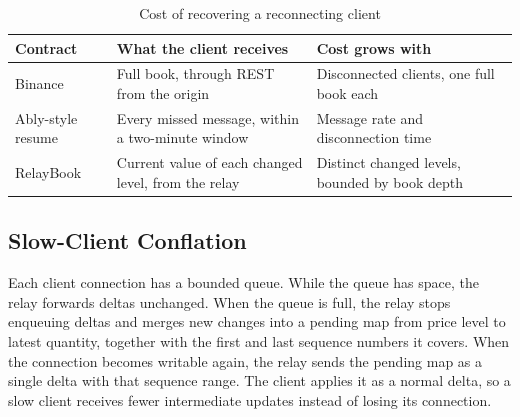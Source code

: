 \documentclass[conference]{IEEEtran}
\begin{document}
\begin{table}[t]
\caption{Cost of recovering a reconnecting client}
\label{tab:recovery}
\centering
\footnotesize
\begin{tabular}{p{1.5cm}p{3.1cm}p{2.6cm}}
\toprule
Contract & What the client receives & Cost grows with \\
\midrule
Binance & Full book, through REST from the origin & Disconnected clients, one full book each \\
Ably-style resume & Every missed message, within a two-minute window & Message rate and disconnection time \\
RelayBook & Current value of each changed level, from the relay & Distinct changed levels, bounded by book depth \\
\bottomrule
\end{tabular}
\end{table}

\begin{algorithm}[t]
\caption{State-based resume at a relay}
\label{alg:resume}
\end{algorithm}

\subsection{Slow-Client Conflation}

Each client connection has a bounded queue. While the queue has space, the relay forwards deltas unchanged. When the queue is full, the relay stops enqueuing deltas and merges new changes into a pending map from price level to latest quantity, together with the first and last sequence numbers it covers. When the connection becomes writable again, the relay sends the pending map as a single delta with that sequence range. The client applies it as a normal delta, so a slow client receives fewer intermediate updates instead of losing its connection.
\end{document}
